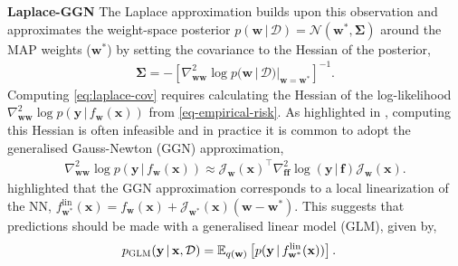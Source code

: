 \documentclass{article}
\newcommand{\weights}{\ensuremath{\mathbf{w}}}
\newcommand{\mbf}[1]{\mathbf{#1}}
\renewcommand{\mid}{\,|\,}
\newcommand{\vf}{\mbf{f}}
\newcommand{\vx}{\mbf{x}}
\newcommand{\vy}{\mbf{y}}
\newcommand{\vw}{\mbf{w}}
\newcommand{\Jac}[2]{\mathcal{J}_{#1}(#2)}
\begin{document}
\textbf{Laplace-GGN}
The Laplace approximation \citet{aa} builds upon this observation and approximates the weight-space posterior $p(\vw \mid \mathcal{D}) = \mathcal{N}(\vw^{*} , \bm\Sigma)$
around the MAP weights ($\vw^{*}$) by setting the covariance to the Hessian of the posterior,
\begin{align} \label{eq:laplace-cov}
 \bm\Sigma = - \left[\nabla^{2}_{\vw\vw} \log p(\vw \mid \mathcal{D})  |_{\vw=\vw^{*}} \right]^{-1}.
\end{align}
Computing \cref{eq:laplace-cov} requires calculating the Hessian of the log-likelihood $\nabla^{2}_{\vw\vw} \log p(\vy \mid f_{\vw}(\vx))$ from \cref{eq-empirical-risk}.
As highlighted in \citet{immer2021improving}, computing this Hessian is often infeasible and in practice it is common to adopt the
generalised Gauss-Newton (GGN) approximation,
\begin{align}
 \nabla^{2}_{\vw\vw} \log p(\vy \mid f_{\vw}(\vx)) \approx \Jac{\vw}{\vx}^{\top} \nabla_{\vf\vf}^{2}\log(\vy\mid\vf) \Jac{\vw}{\vx}.
\end{align}
\citet{immer2021improving} highlighted that the GGN approximation corresponds to a local linearization of the NN,
$f_{\weights^{*}}^{\text{lin}}(\vx) = f_{\weights}(\vx) + \Jac{\weights^{*}}{\vx}(\weights-\weights^{*})$.
This suggests that predictions should be made with a generalised linear model (GLM), given by,
\begin{align} \label{eq-glm}
  p_{\text{\sc GLM}}(\vy \mid \vx, \mathcal{D}) &= \E_{q(\vw)} \left[ p(\vy \mid f_{\vw^{*}}^{\text{lin}}(\vx))\right]. %
\end{align}
\end{document}
